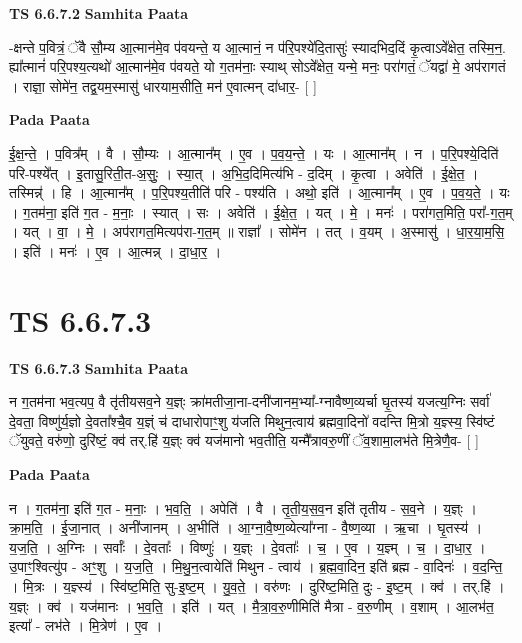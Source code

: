 \documentclass[17pt]{extarticle}
\begin{document}
\textbf{TS 6.6.7.2 } \newline
\textbf{Samhita Paata} \newline

-क्षन्ते प॒वित्रं॒ ॅवै सौ॒म्य आ॒त्मान॑मे॒व प॑वयन्ते॒ य आ॒त्मानं॒ न प॑रि॒पश्ये॑दि॒तासुः॑ स्यादभिद॒दिं कृ॒त्वाऽवे᳚क्षेत॒ तस्मि॒न॒. ह्या᳚त्मानं॑ परि॒पश्य॒त्यथो॑ आ॒त्मान॑मे॒व प॑वयते॒ यो ग॒तम॑नाः॒ स्याथ् सोऽवे᳚क्षेत॒ यन्मे॒ मनः॒ परा॑गतं॒ ॅयद्वा॑ मे॒ अप॑रागतं । राज्ञा॒ सोमे॑न॒ तद्व॒यम॒स्मासु॑ धारयाम॒सीति॒ मन॑ ए॒वात्मन् दा॑धार॒- [  ] \newline

\textbf{Pada Paata} \newline

ई॒क्ष॒न्ते॒ । प॒वित्र᳚म् । वै । सौ॒म्यः । आ॒त्मान᳚म् । ए॒व । प॒व॒य॒न्ते॒ । यः । आ॒त्मान᳚म् । न । प॒रि॒पश्ये॒दिति॑ परि-पश्ये᳚त् । इ॒तासु॒रिती॒त-अ॒सुः॒ । स्या॒त् । अ॒भि॒द॒दिमित्य॑भि - द॒दिम् । कृ॒त्वा । अवेति॑ । ई॒क्षे॒त॒ । तस्मिन्न्॑ । हि । आ॒त्मान᳚म् । प॒रि॒पश्य॒तीति॑ परि - पश्य॑ति । अथो॒ इति॑ । आ॒त्मान᳚म् । ए॒व । प॒व॒य॒ते॒ । यः । ग॒तम॑ना॒ इति॑ ग॒त - म॒नाः॒ । स्यात् । सः । अवेति॑ । ई॒क्षे॒त॒ । यत् । मे॒ । मनः॑ । परा॑गत॒मिति॒ परा᳚-ग॒त॒म् । यत् । वा॒ । मे॒ । अप॑रागत॒मित्यप॑रा-ग॒त॒म् ॥ राज्ञा᳚ । सोमे॑न । तत् । व॒यम् । अ॒स्मासु॑ । धा॒र॒या॒म॒सि॒ । इति॑ । मनः॑ । ए॒व । आ॒त्मन्न् । दा॒धा॒र॒ ।  \newline





\section{ TS 6.6.7.3 }

\textbf{TS 6.6.7.3 } \newline
\textbf{Samhita Paata} \newline

न ग॒तम॑ना भव॒त्यप॒ वै तृ॑तीयसव॒ने य॒ज्ञ्ः क्रा॑मतीजा॒ना-दनी॑जानम॒भ्या᳚-ग्नावैष्ण॒व्यर्चा घृ॒तस्य॑ यजत्य॒ग्निः सर्वा॑ दे॒वता॒ विष्णु॑र्य॒ज्ञो दे॒वता᳚श्चै॒व य॒ज्ञ्ं च॑ दाधारोपाꣳ॒॒शु य॑जति मिथुन॒त्वाय॑ ब्रह्मवा॒दिनो॑ वदन्ति मि॒त्रो य॒ज्ञ्स्य॒ स्वि॑ष्टं ॅयुवते॒ वरु॑णो॒ दुरि॑ष्टं॒ क्व॑ तर्.हि॑ य॒ज्ञ्ः क्व॑ यज॑मानो भव॒तीति॒ यन्मै᳚त्रावरु॒णीं ॅव॒शामा॒लभ॑ते मि॒त्रेणै॒व- [  ] \newline

\textbf{Pada Paata} \newline

न । ग॒तम॑ना॒ इति॑ ग॒त - म॒नाः॒ । भ॒व॒ति॒ । अपेति॑ । वै । तृ॒ती॒य॒स॒व॒न इति॑ तृतीय - स॒व॒ने । य॒ज्ञ्ः । क्रा॒म॒ति॒ । ई॒जा॒नात् । अनी॑जानम् । अ॒भीति॑ । आ॒ग्ना॒वै॒ष्ण॒व्येत्या᳚ग्ना - वै॒ष्ण॒व्या । ऋ॒चा । घृ॒तस्य॑ । य॒ज॒ति॒ । अ॒ग्निः । सर्वाः᳚ । दे॒वताः᳚ । विष्णुः॑ । य॒ज्ञ्ः । दे॒वताः᳚ । च॒ । ए॒व । य॒ज्ञ्म् । च॒ । दा॒धा॒र॒ । उ॒पाꣳ॒॒श्वित्यु॑प - अꣳ॒॒शु । य॒ज॒ति॒ । मि॒थु॒न॒त्वायेति॑ मिथुन - त्वाय॑ । ब्र॒ह्म॒वा॒दिन॒ इति॑ ब्रह्म - वा॒दिनः॑ । व॒द॒न्ति॒ । मि॒त्रः । य॒ज्ञ्स्य॑ । स्वि॑ष्ट॒मिति॒ सु-इ॒ष्ट॒म् । यु॒व॒ते॒ । वरु॑णः । दुरि॑ष्ट॒मिति॒ दुः - इ॒ष्ट॒म् । क्व॑ । तर्.हि॑ । य॒ज्ञ्ः । क्व॑ । यज॑मानः । भ॒व॒ति॒ । इति॑ । यत् । मै॒त्रा॒व॒रु॒णीमिति॑ मैत्रा - व॒रु॒णीम् । व॒शाम् । आ॒लभ॑त॒ इत्या᳚ - लभ॑ते । मि॒त्रेण॑ । ए॒व ।  \newline
\end{document}
